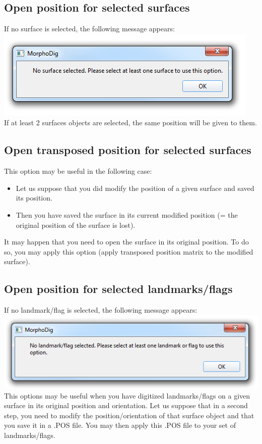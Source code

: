 \subsection{Open position for selected surfaces}
If no surface is selected, the following message
appears:\\
\includegraphics[scale=0.5]{images/07/position/no_surface_selected.png}
\\
If at least 2 surfaces objects are selected, the same position will be given to them.

\subsection{Open transposed position for selected surfaces}
This option may be useful in the following case:
\begin{itemize}
\item Let us suppose that you did modify the position of a given surface and saved its position.
\item Then you have saved the surface in its current modified position (= the original position of the
surface is lost).
\end{itemize}

It may happen that you need to open the surface in its original position. To do so, you may apply this option (apply transposed position matrix to the modified surface).

\subsection{Open position for selected landmarks/flags}
If no landmark/flag is selected, the following message
appears:\\
\includegraphics[scale=0.5]{images/07/position/no_landmark_selected.png}
\\
This options may be useful when you have digitized landmarks/flags on a given surface in its original position and orientation. Let us suppose that in a second step, you need to modify the position/orientation of that surface object and that you save it in a .POS file. You may then apply this .POS file to your set of landmarks/flags.

